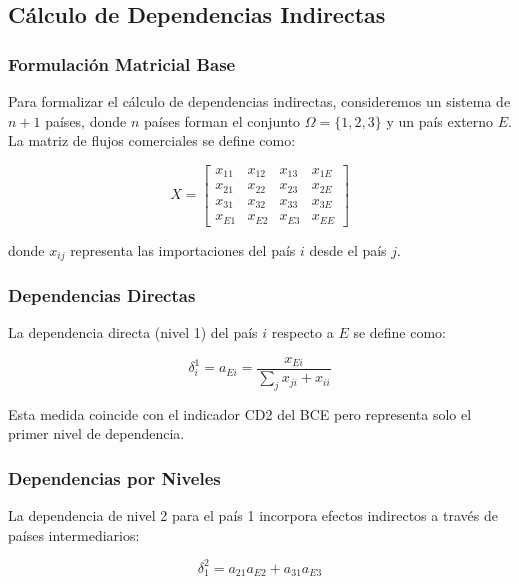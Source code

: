 \documentclass[5p,authoryear]{elsarticle}
\begin{document}
\subsection{Cálculo de Dependencias Indirectas}
\subsubsection{Formulación Matricial Base}

Para formalizar el cálculo de dependencias indirectas, consideremos un sistema de $n+1$ países, donde $n$ países forman el conjunto $\Omega = \{1,2,3\}$ y un país externo $E$. La matriz de flujos comerciales se define como:

\begin{equation}
    X =
    \begin{bmatrix}
    x_{11} & x_{12} & x_{13} & x_{1E} \\
    x_{21} & x_{22} & x_{23} & x_{2E} \\
    x_{31} & x_{32} & x_{33} & x_{3E} \\
    x_{E1} & x_{E2} & x_{E3} & x_{EE}
    \end{bmatrix}
\end{equation}

donde $x_{ij}$ representa las importaciones del país $i$ desde el país $j$.

\subsubsection{Dependencias Directas}
La dependencia directa (nivel 1) del país $i$ respecto a $E$ se define como:

\begin{equation}
    \delta_i^1 = a_{Ei} = \frac{x_{Ei}}{\sum_{j} x_{ji} + x_{ii}}
\end{equation}

Esta medida coincide con el indicador CD2 del BCE pero representa solo el primer nivel de dependencia.

\subsubsection{Dependencias por Niveles}

La dependencia de nivel 2 para el país 1 incorpora efectos indirectos a través de países intermediarios:

\begin{equation}
    \delta_1^2 = a_{21}a_{E2} + a_{31}a_{E3}
\end{equation}
\end{document}
